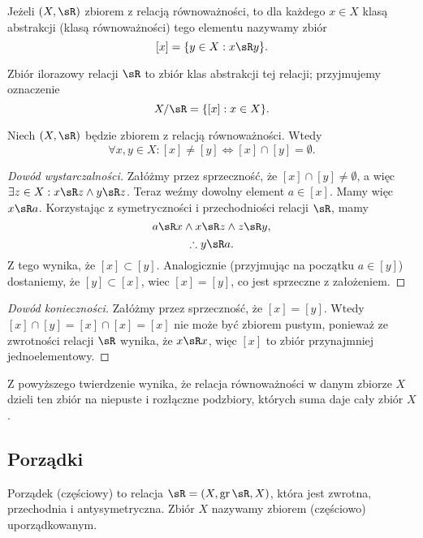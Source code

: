 \begin{definition}
    Jeżeli $(X, \sR)$ zbiorem z relacją równoważności, to dla każdego $x \in X$ klasą abstrakcji (klasą równoważności) tego elementu nazywamy zbiór
    $$ [x] = \{y \in X : x \sR y\}. $$
\end{definition}

\begin{definition}
    Zbiór ilorazowy relacji $\sR$ to zbiór klas abstrakcji tej relacji; przyjmujemy oznaczenie
    $$ X/\sR = \{[x] : x \in X\}. $$
\end{definition}

\begin{theorem}
    Niech $(X, \sR)$ będzie zbiorem z relacją równoważności. Wtedy
    $$ \forall x, y \in X : [x] \neq [y] \iff [x] \cap [y] = \emptyset . $$
\end{theorem}
\begin{proof}[Dowód wystarczalności]\renewcommand{\qedsymbol}{}
    Załóżmy przez sprzeczność, że $[x] \cap [y] \neq \emptyset$, a więc $\exists z \in X : x \sR z \wedge y \sR z$. Teraz weźmy dowolny element $a \in [x]$. Mamy więc $x \sR a$. Korzystając z symetryczności i przechodniości relacji $\sR$, mamy
    $$ a \sR x \wedge x \sR z \wedge z \sR y, $$
    $$ \therefore y \sR a. $$
    Z tego wynika, że $[x] \subset [y]$. Analogicznie (przyjmując na początku $a \in [y]$) dostaniemy, że $[y] \subset [x]$, wiec $[x] = [y]$, co jest sprzeczne z założeniem.
\end{proof}
\begin{proof}[Dowód konieczności]
    Załóżmy przez sprzeczność, że $[x] = [y]$. Wtedy $[x] \cap [y] = [x] \cap [x] = [x]$ nie może być zbiorem pustym, ponieważ ze zwrotności relacji $\sR$ wynika, że $x \sR x$, więc $[x]$ to zbiór przynajmniej jednoelementowy.
\end{proof}

Z powyższego twierdzenie wynika, że relacja równoważności w danym zbiorze $X$ dzieli ten zbiór na niepuste i rozłączne podzbiory, których suma daje cały zbiór $X$.

\subsection{Porządki}
\begin{definition}
    Porządek (częściowy) to relacja $\sR = (X, \gr\sR, X)$, która jest zwrotna, przechodnia i antysymetryczna. Zbiór $X$ nazywamy zbiorem (częściowo) uporządkowanym.
\end{definition}


